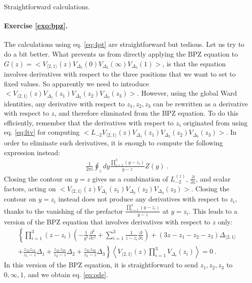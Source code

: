 \documentclass[12pt, a4paper]{article}
\theoremstyle{break}
\begin{document}
Straightforward calculations.

\paragraph{Exercise \ref{exo:bpz}.}

The calculations using eq. \eqref{eq:4pt} are straightforward but tedious. Let us try to do a bit better. What prevents us from directly applying the BPZ equation to $G(z)=\Big< V_{\langle 2, 1 \rangle}(z) V_{\Delta_1}(0)V_{\Delta_2}(\infty)V_{\Delta_3}(1) \Big>$, is that the equation involves derivatives with respect to the three positions that we want to set to fixed values. So apparently we need to introduce $\Big< V_{\langle 2, 1 \rangle}(z) V_{\Delta_1}(z_1)V_{\Delta_2}(z_2)V_{\Delta_3}(z_3) \Big>$. 
However, using the global Ward identities, any derivative with respect to $z_1,z_2,z_3$ can be rewritten as a derivative with respect to $z$, and therefore eliminated from the BPZ equation. To do this efficiently, remember that the derivatives with respect to $z_i$ originated from using eq. \eqref{eq:ltv} for computing $\Big< L_{-2}V_{\langle 2, 1 \rangle}(z) V_{\Delta_1}(z_1)V_{\Delta_2}(z_2)V_{\Delta_3}(z_3) \Big>$. In order to eliminate such derivatives, it is enough to compute the following expression instead:
\begin{align}
 \frac{1}{2\pi i}\oint_{z} dy\frac{\prod_{i=1}^3(y-z_i)}{y-z} Z(y) \ .
\end{align}
Closing the contour on $y=z$ gives us a combination of $L_{-2}^{(z)}$, $\frac{\partial}{\partial z}$, and scalar factors, acting on  $\Big< V_{\langle 2, 1 \rangle}(z) V_{\Delta_1}(z_1)V_{\Delta_2}(z_2)V_{\Delta_3}(z_3) \Big>$. Closing the contour on $y=z_i$ instead does not produce any derivatives with respect to $z_i$, thanks to the vanishing of the prefactor $\frac{\prod_{i=1}^3(y-z_i)}{y-z}$ at $y=z_i$. This leads to a version of the BPZ equation that involves derivatives with respect to $z$ only:
\begin{multline}
  \left\{ \prod_{i=1}^3(z-z_i)\left(-\frac{1}{b^2}\frac{\partial^2}{\partial z^2} +\sum_{i=1}^3 \frac{1}{z-z_i} {\frac{\partial}{\partial z}} \right) + (3z-z_1-z_2-z_3)\Delta_{\langle 2,1 \rangle} \right.
  \\
\left.  +\frac{z_{12}z_{13}}{z_1-z}\Delta_1 + \frac{z_{21}z_{23}}{z_2-z}\Delta_2+\frac{z_{31}z_{32}}{z_3-z}\Delta_3\right\} 
\left\langle V_{\langle 2,1 \rangle}(z)\prod_{i=1}^3 V_{\Delta_i}(z_i)\right\rangle  = 0\ .
\label{uode}
\end{multline}
In this version of the BPZ equation, it is straightforward to send $z_1,z_2,z_3$ to $0,\infty, 1$, and we obtain eq. \eqref{eq:ode}.
\end{document}
